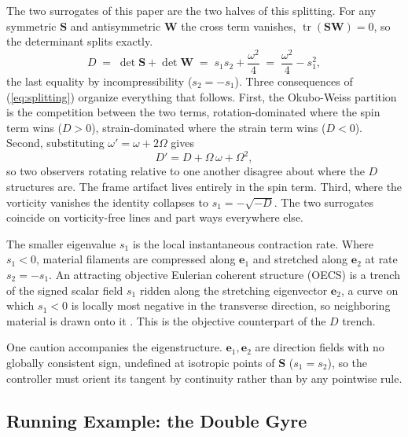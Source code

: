 \documentclass[lettersize,journal]{IEEEtran}
\begin{document}
The two surrogates of this paper are the two halves of this splitting.
For any symmetric $\mathbf{S}$ and antisymmetric $\mathbf{W}$ the cross
term vanishes, $\operatorname{tr}(\mathbf{S}\mathbf{W}) = 0$, so the
determinant splits exactly.
\begin{equation}
    D \;=\; \det\mathbf{S} + \det\mathbf{W}
      \;=\; s_1 s_2 + \frac{\omega^2}{4}
      \;=\; \frac{\omega^2}{4} - s_1^2,
    \label{eq:splitting}
\end{equation}
the last equality by incompressibility ($s_2 = -s_1$). Three
consequences of (\ref{eq:splitting}) organize everything that follows.
First, the Okubo-Weiss partition is the competition between the two
terms, rotation-dominated where the spin term wins ($D > 0$),
strain-dominated where the strain term wins ($D < 0$). Second,
substituting $\omega' = \omega + 2\Omega$ gives
\begin{equation}
    D' = D + \Omega\,\omega + \Omega^2,
    \label{eq:D_not_objective}
\end{equation}
so two observers rotating relative to one another disagree about where
the $D$ structures are. The frame artifact lives entirely in the spin
term. Third, where the vorticity vanishes the identity collapses to
$s_1 = -\sqrt{-D}$. The two surrogates coincide on vorticity-free
lines and part ways everywhere else.

The smaller eigenvalue $s_1$ is the local instantaneous contraction
rate. Where $s_1 < 0$, material filaments are compressed along
$\mathbf{e}_1$ and stretched along $\mathbf{e}_2$ at rate $s_2 = -s_1$.
An attracting objective Eulerian coherent structure (OECS) is a trench
of the signed scalar field $s_1$ ridden along the stretching eigenvector
$\mathbf{e}_2$, a curve on which $s_1 < 0$ is locally most negative in
the transverse direction, so neighboring material is drawn onto it
\cite{25}. This is the objective counterpart of the $D$ trench.

One caution accompanies the eigenstructure. $\mathbf{e}_1, \mathbf{e}_2$ are direction fields
with no globally consistent sign, undefined at isotropic points of
$\mathbf{S}$ ($s_1 = s_2$), so the controller must orient its tangent by
continuity rather than by any pointwise rule.

\subsection{Running Example: the Double Gyre}
\label{sec:dg_example}
\end{document}
